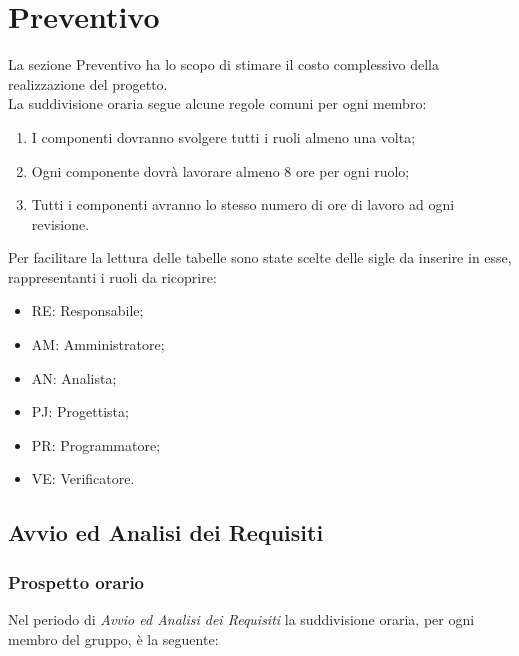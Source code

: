 \section{Preventivo}
\label{Preventivo}

La sezione Preventivo ha lo scopo di stimare il costo complessivo della realizzazione del progetto. \\ 
La suddivisione oraria segue alcune regole comuni per ogni membro:
\begin{enumerate}

	\item I componenti dovranno svolgere tutti i ruoli almeno una volta;
	\item Ogni componente dovrà lavorare almeno 8 ore per ogni ruolo;
	\item Tutti i componenti avranno lo stesso numero di ore di lavoro ad ogni revisione.

\end{enumerate}
Per facilitare la lettura delle tabelle sono state scelte delle sigle da inserire in esse, rappresentanti i ruoli da ricoprire:
\begin{itemize}
	\item RE: Responsabile;
	\item AM: Amministratore;
	\item AN: Analista;
	\item PJ: Progettista;
	\item PR: Programmatore;
	\item VE: Verificatore.
\end{itemize}

\newpage
\subsection{Avvio ed Analisi dei Requisiti}
\label{PAAR}
\subsubsection{Prospetto orario}

Nel periodo di \textit{Avvio ed Analisi dei Requisiti} la suddivisione oraria, per ogni membro del gruppo, è la seguente:


